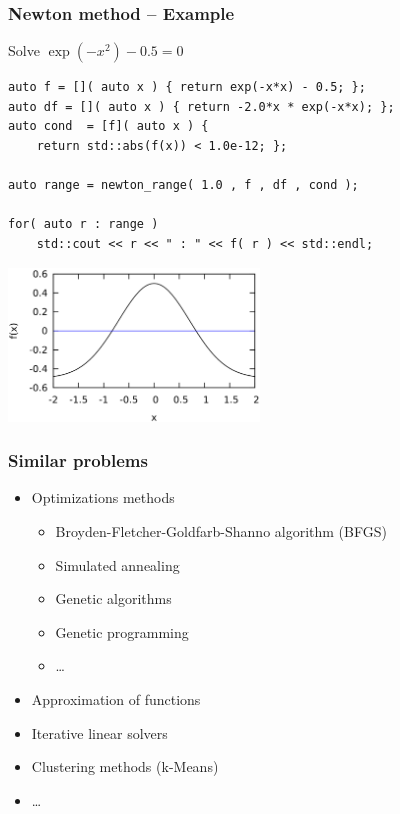 \documentclass{beamer}
\newcommand{\heading}[1]{\frametitle{#1}}
\begin{document}
\begin{frame}[fragile]
 \heading{Newton method -- Example}
 
 Solve $\exp(-x^2) - 0.5 = 0$
 
 \vspace{1ex}
\begin{lstlisting}[basicstyle=\scriptsize\ttfamily]
auto f = []( auto x ) { return exp(-x*x) - 0.5; };
auto df = []( auto x ) { return -2.0*x * exp(-x*x); };
auto cond  = [f]( auto x ) {
    return std::abs(f(x)) < 1.0e-12; };

auto range = newton_range( 1.0 , f , df , cond );

for( auto r : range )
    std::cout << r << " : " << f( r ) << std::endl;
\end{lstlisting}


 \centerline{ 
\includegraphics[draft=false,width=0.5\textwidth]{newton1}} 

\end{frame}


\begin{frame}[fragile]
 \heading{Similar problems}
 
 \begin{itemize}
  \item Optimizations methods
  \begin{itemize}
    \item Broyden-Fletcher-Goldfarb-Shanno algorithm (BFGS)
    \item Simulated annealing
    \item Genetic algorithms
    \item Genetic programming
    \item \dots
  \end{itemize}
  \item Approximation of functions
  \item Iterative linear solvers
  \item Clustering methods (k-Means)
  \item \dots
 \end{itemize}

\end{frame}
\end{document}
